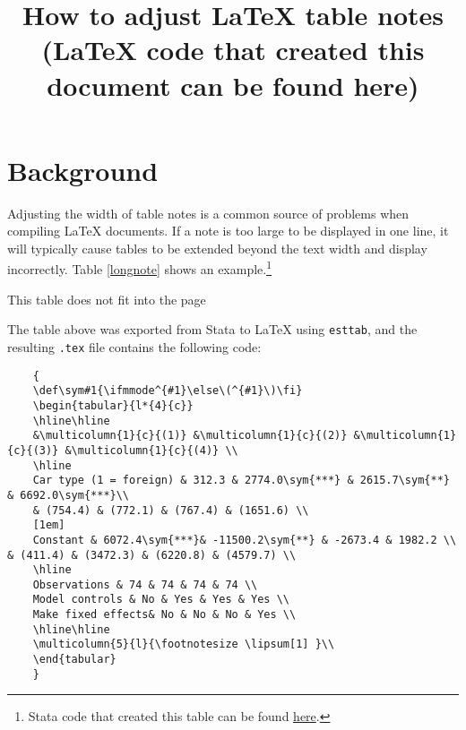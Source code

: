 \documentclass[11pt,a4paper]{article}
\title{How to adjust LaTeX table notes \\  \large ({\LaTeX} code that created this document can be found here)}
\begin{document}
\maketitle
\section{Background}

Adjusting the width of table notes is a common source of problems when compiling {\LaTeX} documents. If a note is too large to be displayed in one line, it will typically cause tables to be extended beyond the text width and display incorrectly. Table \ref{longnote} shows an example.\footnote{Stata code that created this table can be found \href{https://gist.github.com/luizaandrade/83bc1bae403a50616c82dd33c54b57b3}{here}.}

\begin{table}[H]
	\caption{This table does not fit into the page}
	\label{longnote}
	
\end{table}

The table above was exported from Stata to {\LaTeX} using \texttt{esttab}, and the resulting \texttt{.tex} file contains the following code:

\begin{tiny}
	\begin{verbatim}
	{
	\def\sym#1{\ifmmode^{#1}\else\(^{#1}\)\fi}
	\begin{tabular}{l*{4}{c}}
	\hline\hline
	&\multicolumn{1}{c}{(1)} &\multicolumn{1}{c}{(2)} &\multicolumn{1}{c}{(3)} &\multicolumn{1}{c}{(4)} \\
	\hline
	Car type (1 = foreign) & 312.3 & 2774.0\sym{***} & 2615.7\sym{**} & 6692.0\sym{***}\\
	& (754.4) & (772.1) & (767.4) & (1651.6) \\
	[1em]
	Constant & 6072.4\sym{***}& -11500.2\sym{**} & -2673.4 & 1982.2 \\ & (411.4) & (3472.3) & (6220.8) & (4579.7) \\
	\hline
	Observations & 74 & 74 & 74 & 74 \\
	Model controls & No & Yes & Yes & Yes \\
	Make fixed effects& No & No & No & Yes \\
	\hline\hline 
	\multicolumn{5}{l}{\footnotesize \lipsum[1] }\\ 
	\end{tabular}
	}
	\end{verbatim}
\end{tiny}
\end{document}
